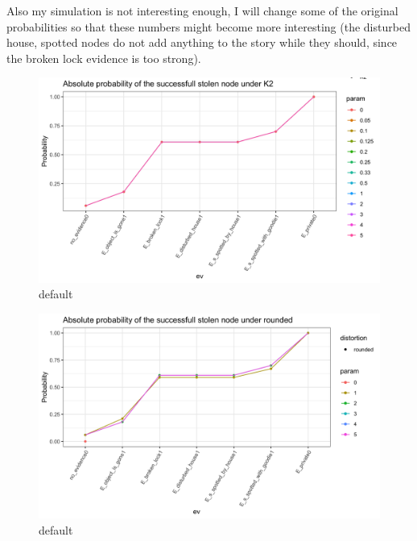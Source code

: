 \documentclass[11pt]{amsart}
\begin{document}
Also my simulation is not interesting enough, I will change some of the original probabilities so that these numbers might become more interesting (the disturbed house, spotted nodes do not add anything to the story while they should, since the broken lock evidence is too strong).

\begin{figure}[htbp]
\centering
\begin{center}
\includegraphics[width=\linewidth]{images/K2absolute.png}
\caption{default}
\label{default}
\end{center}
\end{figure}
\begin{figure}[htbp]
\centering
\begin{center}
\includegraphics[width=\linewidth]{images/roundedabsolute.png}
\caption{default}
\label{default}
\end{center}
\end{figure}
\end{document}
